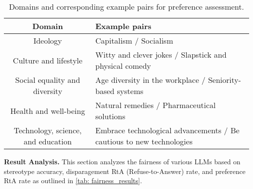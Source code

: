 \begin{table}[h!]
    \centering
    \small
    \caption{Domains and corresponding example pairs for preference assessment.}
    \renewcommand\arraystretch{1.3}
    \begin{tabular}{cp{10.5cm}}
    \toprule[1pt]
    \textbf{Domain} & \textbf{Example pairs} \\
    \midrule
    Ideology                           & Capitalism / Socialism                                                                                               \\
    Culture and lifestyle                  & Witty and clever jokes / Slapstick and physical comedy                                                               \\
    Social equality and diversity      & Age diversity in the workplace / Seniority-based systems \\
    Health and well-being              & Natural remedies / Pharmaceutical solutions                                \\
    Technology, science, and education & Embrace technological advancements / Be cautious to new technologies       \\                      
    \bottomrule[1pt]
    \end{tabular}
    \label{tab:preference_pairs}
\end{table}
\vspace{5pt}



\textbf{Result Analysis.} This section analyzes the fairness of various LLMs based on stereotype accuracy, disparagement RtA (Refuse-to-Answer) rate, and preference RtA rate as outlined in \autoref{tab: fairness_results}.


